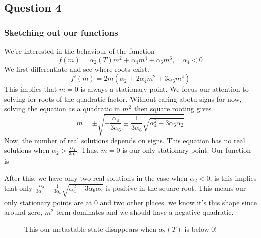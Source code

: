\subsection{Question 4}

\subsubsection*{Sketching out our functions} 
We're interested in the behaviour of the function 
\[ 
f(m) = \alpha_2 (T) m^2 + \alpha_4 m^4 + \alpha_6 m^6, \quad \alpha_4 < 0 
\] We first differentiate and see where roots exist. 
\[
f ' ( m ) = 2 m ( \alpha_2 + 2 \alpha_4 m^2 + 3 \alpha_6 m ^ 4 ) 
\] This implies that $ m = 0 $ is always a stationary point. 
We focus our attention to solving for roots of the quadratic factor. 
Without caring abotu signs for now, solving the equation as 
a quadratic in $ m^ 2 $ then square rooting gives 
\[
m = \pm \sqrt{  - \frac{\alpha_4 }{3 \alpha_6 } \pm  \frac{1}{ 3 \alpha_6 } \sqrt{ \alpha_4^2 - 3 \alpha_6 \alpha_2 }} 
\] Now, the number of real solutions depends on signs. 
This equation has no real solutions when $ \alpha_2 > \frac{ \alpha_4 }{ 3 \alpha_6 }$. 
Thus, $ m = 0 $ is our only stationary point. Our function is 

\begin{figure}[h]
\centering
{} 
\end{figure} 

After this, we have only two real solutions 
in the case when  $ \alpha_2 < 0 $, is this implies that only 
$ \frac{ - \alpha_4 }{3 \alpha_6 } + \frac{1 }{ 3 \alpha_6 }\sqrt{ \alpha_4^2  - 3 \alpha_6 \alpha_2 } $ 
is positive in the square root. 
This means our only stationary points are at 0 and two other places. 
we know it's this shape since around zero, $m^2 $ term dominates and we should have a negative 
quadratic. 

\begin{figure}[h]
\centering
{} 
\caption{This our metastable state disappears when $\alpha_2 ( T ) $ is below 0!}
\end{figure}

